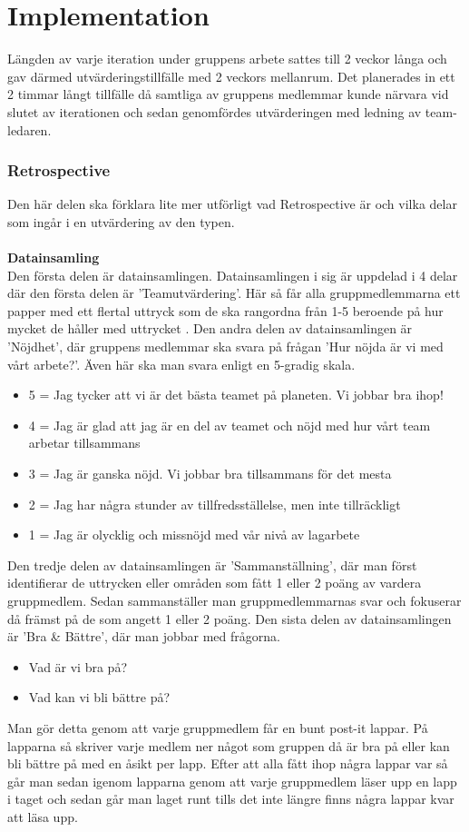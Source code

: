 \section{Implementation}
\label{sec:implementation}

Längden av varje iteration under gruppens arbete sattes till 2 veckor långa och gav därmed utvärderingstillfälle med 2 veckors mellanrum.
Det planerades in ett 2 timmar långt tillfälle då samtliga av gruppens medlemmar kunde närvara vid slutet av iterationen och sedan genomfördes utvärderingen med ledning av team-ledaren. 

\subsubsection{Retrospective}
Den här delen ska förklara lite mer utförligt vad Retrospective är och vilka delar som ingår i en utvärdering av den typen.\\ \\
\textbf{Datainsamling}\\
Den första delen är datainsamlingen. Datainsamlingen i sig är uppdelad i 4 delar där den första delen är 'Teamutvärdering'. 
Här så får alla gruppmedlemmarna ett papper med ett flertal uttryck som de ska rangordna från 1-5 beroende på hur mycket de håller med uttrycket \cite{Team-utvärderings-pappret}. 
Den andra delen av datainsamlingen är 'Nöjdhet', där gruppens medlemmar ska svara på frågan 'Hur nöjda är vi med vårt arbete?'. Även här ska man svara enligt en 5-gradig skala.
\begin{itemize}
\item 5 = Jag tycker att vi är det bästa teamet på planeten. Vi jobbar bra ihop!
\item 4	= Jag är glad att jag är en del av teamet och nöjd med hur vårt team arbetar tillsammans
\item 3	= Jag är ganska nöjd. Vi jobbar bra tillsammans för det mesta
\item 2	= Jag har några stunder av tillfredsställelse, men inte tillräckligt
\item 1	= Jag är olycklig och missnöjd med vår nivå av lagarbete
\end{itemize}

Den tredje delen av datainsamlingen är 'Sammanställning', där man först identifierar de uttrycken eller områden som fått 1 eller 2 poäng av vardera gruppmedlem. Sedan sammanställer man gruppmedlemmarnas svar och fokuserar då främst på de som angett 1 eller 2 poäng.
Den sista delen av datainsamlingen är 'Bra \& Bättre', där man jobbar med frågorna.
\begin{itemize}
\item Vad är vi bra på?
\item Vad kan vi bli bättre på?
\end{itemize}
Man gör detta genom att varje gruppmedlem får en bunt post-it lappar. På lapparna så skriver varje medlem ner något som gruppen då är bra på eller kan bli bättre på med en åsikt per lapp. Efter att alla fått ihop några lappar var så går man sedan igenom lapparna genom att varje gruppmedlem läser upp en lapp i taget och sedan går man laget runt tills det inte längre finns några lappar kvar att läsa upp.

